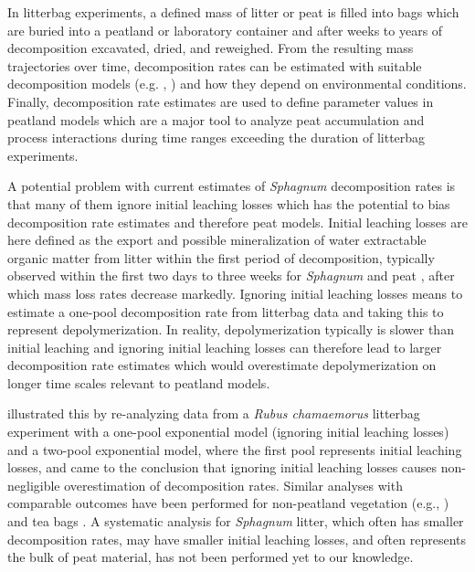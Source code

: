 \documentclass[bg, manuscript]{copernicus}
\begin{document}
In litterbag experiments, a defined mass of litter or peat is filled into bags which are buried into a peatland or laboratory container and after weeks to years of decomposition excavated, dried, and reweighed. From the resulting mass trajectories over time, decomposition rates can be estimated with suitable decomposition models (e.g. \citet{Frolking.2001}, \citet{Rovira.2010}) and how they depend on environmental conditions. Finally, decomposition rate estimates are used to define parameter values in peatland models which are a major tool to analyze peat accumulation and process interactions during time ranges exceeding the duration of litterbag experiments.

A potential problem with current estimates of \emph{Sphagnum} decomposition rates is that many of them ignore initial leaching losses which has the potential to bias decomposition rate estimates and therefore peat models. Initial leaching losses are here defined as the export and possible mineralization of water extractable organic matter from litter within the first period of decomposition, typically observed within the first two days to three weeks for \emph{Sphagnum} and peat \citep{Coulson.1978, Thormann.2001, Moore.2001, Kim.2014, Muller.2023}, after which mass loss rates decrease markedly. Ignoring initial leaching losses means to estimate a one-pool decomposition rate from litterbag data and taking this to represent depolymerization. In reality, depolymerization typically is slower than initial leaching and ignoring initial leaching losses can therefore lead to larger decomposition rate estimates which would overestimate depolymerization on longer time scales relevant to peatland models.

\citet{Yu.2001} illustrated this by re-analyzing data from a \emph{Rubus chamaemorus} litterbag experiment with a one-pool exponential model (ignoring initial leaching losses) and a two-pool exponential model, where the first pool represents initial leaching losses, and came to the conclusion that ignoring initial leaching losses causes non-negligible overestimation of decomposition rates. Similar analyses with comparable outcomes have been performed for non-peatland vegetation (e.g., \citet{Barlocher.1997}) and tea bags \citep{Lind.2022}. A systematic analysis for \emph{Sphagnum} litter, which often has smaller decomposition rates, may have smaller initial leaching losses, and often represents the bulk of peat material, has not been performed yet to our knowledge.
\end{document}
